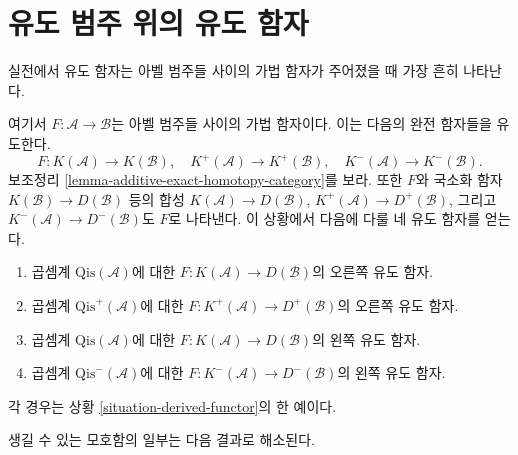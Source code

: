 \section{유도 범주 위의 유도 함자}
\label{section-derived-functors-classical}

\noindent
실전에서 유도 함자는 아벨 범주들 사이의 가법 함자가 주어졌을 때 가장
흔히 나타난다.

\begin{situation}
\label{situation-classical}
여기서 $F : \mathcal{A} \to \mathcal{B}$는 아벨 범주들 사이의 가법
함자이다. 이는 다음의 완전 함자들을 유도한다.
$$
F : K(\mathcal{A}) \to K(\mathcal{B}), \quad
K^{+}(\mathcal{A}) \to K^{+}(\mathcal{B}), \quad
K^{-}(\mathcal{A}) \to K^{-}(\mathcal{B}).
$$
보조정리 \ref{lemma-additive-exact-homotopy-category}를 보라.
또한 $F$와 국소화 함자 $K(\mathcal{B}) \to D(\mathcal{B})$ 등의 합성
$K(\mathcal{A}) \to D(\mathcal{B})$,
$K^{+}(\mathcal{A}) \to D^{+}(\mathcal{B})$, 그리고
$K^{-}(\mathcal{A}) \to D^-(\mathcal{B})$도 $F$로 나타낸다.
이 상황에서 다음에 다룰 네 유도 함자를 얻는다.
\begin{enumerate}
\item 곱셈계 $\text{Qis}(\mathcal{A})$에 대한
$F : K(\mathcal{A}) \to D(\mathcal{B})$의 오른쪽 유도 함자.
\item 곱셈계 $\text{Qis}^{+}(\mathcal{A})$에 대한
$F : K^{+}(\mathcal{A}) \to D^{+}(\mathcal{B})$의 오른쪽 유도 함자.
\item 곱셈계 $\text{Qis}(\mathcal{A})$에 대한
$F : K(\mathcal{A}) \to D(\mathcal{B})$의 왼쪽 유도 함자.
\item 곱셈계 $\text{Qis}^-(\mathcal{A})$에 대한
$F : K^{-}(\mathcal{A}) \to D^{-}(\mathcal{B})$의 왼쪽 유도 함자.
\end{enumerate}
각 경우는 상황 \ref{situation-derived-functor}의 한 예이다.
\end{situation}

\noindent
생길 수 있는 모호함의 일부는 다음 결과로 해소된다.

